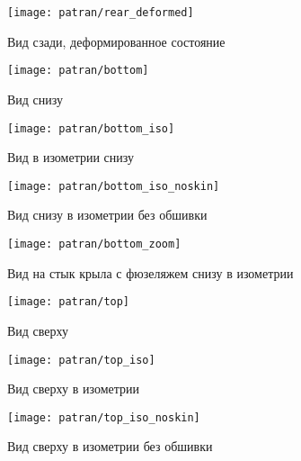 \begin{figure}[H]
\centering
\texttt{[image: patran/rear\_deformed]}
\caption{Вид сзади, деформированное состояние}
\label{fig:patranRearDeformed}
\end{figure}


\begin{figure}[H]
\centering
\texttt{[image: patran/bottom]}
\caption{Вид снизу}
\label{fig:patranBottom}
\end{figure}

\begin{figure}[H]
\centering
\texttt{[image: patran/bottom\_iso]}
\caption{Вид в изометрии снизу}
\label{fig:patranBottomIso}
\end{figure}

\begin{figure}[H]
\centering
\texttt{[image: patran/bottom\_iso\_noskin]}
\caption{Вид снизу в изометрии без обшивки}
\label{fig:patranBottomIsoWithoutSkin}
\end{figure}

\begin{figure}[H]
\centering
\texttt{[image: patran/bottom\_zoom]}
\caption{Вид на стык крыла с фюзеляжем снизу в изометрии}
\label{fig:patranBottomIsoZoom}
\end{figure}

\begin{figure}[H]
\centering
\texttt{[image: patran/top]}
\caption{Вид сверху}
\label{fig:patranTop}
\end{figure}

\begin{figure}[H]
\centering
\texttt{[image: patran/top\_iso]}
\caption{Вид сверху в изометрии}
\label{fig:patranTopIso}
\end{figure}

\begin{figure}[H]
\centering
\texttt{[image: patran/top\_iso\_noskin]}
\caption{Вид сверху в изометрии без обшивки}
\label{fig:patranTopIsoWithoutSk}
\end{figure}

%
